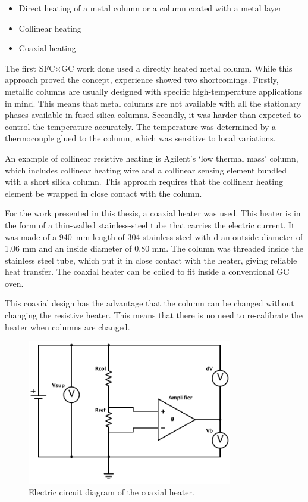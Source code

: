 \begin{itemize}
  \item Direct heating of a metal column or a column coated with a metal layer
  \item Collinear heating
  \item Coaxial heating
\end{itemize}

The first SFC×GC work done \autocite{Venter2004} used a directly heated metal
column. While this approach proved the concept, experience showed two
shortcomings. Firstly, metallic columns are usually designed with specific
high-temperature applications in mind. This means that metal columns are not
available with all the stationary phases available in fused-silica columns.
Secondly, it was harder than expected to control the temperature accurately. The
temperature was determined by a thermocouple glued to the column, which was
sensitive to local variations.

An example of collinear resistive heating is Agilent\texttrademark{}'s
`low thermal mass' column, which includes collinear heating wire and a collinear
sensing element bundled with a short silica column. This approach requires that
the collinear heating element be wrapped in close contact with the column.

For the work presented in this thesis, a coaxial heater was used. This heater is
in the form of a thin-walled stainless-steel tube that carries the electric
current. It was made of a \SI{940}{\milli\metre} length of 304 stainless steel
with d an outside diameter of 1.06 mm and an inside diameter of 0.80 mm. The
column was threaded inside the stainless steel tube, which put it in close
contact with the heater, giving reliable heat transfer. The coaxial heater can be
coiled to fit inside a conventional GC oven.

This coaxial design has the advantage that the column can be changed without
changing the resistive heater. This means that there is no need to re-calibrate
the heater when columns are changed.

\begin{figure}[htbp]
	\centering
	\includegraphics[width=0.8\textwidth]{Figures/Column-Heater.pdf}
	\decoRule
	\caption[Coaxial heater resistance heater]{\label{fig:HeaterDiagram}Electric circuit diagram of the coaxial heater.}
\end{figure}

